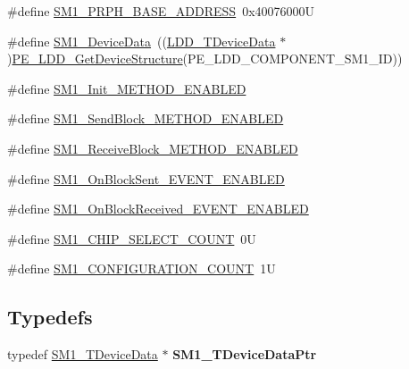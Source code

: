 \begin{DoxyCompactItemize}
\item 
\#define \hyperlink{group___s_m1__module_ga6a4395a6d4c473d7c1197b124efdc668}{S\-M1\-\_\-\-P\-R\-P\-H\-\_\-\-B\-A\-S\-E\-\_\-\-A\-D\-D\-R\-E\-S\-S}~0x40076000\-U
\item 
\#define \hyperlink{group___s_m1__module_gada367b0ac171dbad1e5c5ccfcdaf77a2}{S\-M1\-\_\-\-Device\-Data}~((\hyperlink{group___p_e___types__module_gac5cf1362f1f0e3a2ce71b1bf2276d091}{L\-D\-D\-\_\-\-T\-Device\-Data} $\ast$)\hyperlink{group___p_e___types__module_gaa1c23d559daef5bcd3327ca83fb56f5a}{P\-E\-\_\-\-L\-D\-D\-\_\-\-Get\-Device\-Structure}(P\-E\-\_\-\-L\-D\-D\-\_\-\-C\-O\-M\-P\-O\-N\-E\-N\-T\-\_\-\-S\-M1\-\_\-\-I\-D))
\item 
\#define \hyperlink{group___s_m1__module_gad63dbff60482a14f80f226c0b5731b13}{S\-M1\-\_\-\-Init\-\_\-\-M\-E\-T\-H\-O\-D\-\_\-\-E\-N\-A\-B\-L\-E\-D}
\item 
\#define \hyperlink{group___s_m1__module_gaa3c176c6eacc19cbbb7ae3f737c19693}{S\-M1\-\_\-\-Send\-Block\-\_\-\-M\-E\-T\-H\-O\-D\-\_\-\-E\-N\-A\-B\-L\-E\-D}
\item 
\#define \hyperlink{group___s_m1__module_gaf8134943679ffac8093daf312caa0e34}{S\-M1\-\_\-\-Receive\-Block\-\_\-\-M\-E\-T\-H\-O\-D\-\_\-\-E\-N\-A\-B\-L\-E\-D}
\item 
\#define \hyperlink{group___s_m1__module_gacc1de65aee130ae6911ddd0b36a2c499}{S\-M1\-\_\-\-On\-Block\-Sent\-\_\-\-E\-V\-E\-N\-T\-\_\-\-E\-N\-A\-B\-L\-E\-D}
\item 
\#define \hyperlink{group___s_m1__module_ga662b8a63d6e729f2066fb2495e5d8585}{S\-M1\-\_\-\-On\-Block\-Received\-\_\-\-E\-V\-E\-N\-T\-\_\-\-E\-N\-A\-B\-L\-E\-D}
\item 
\#define \hyperlink{group___s_m1__module_ga98e3a8869b1c791968b881f3b905b876}{S\-M1\-\_\-\-C\-H\-I\-P\-\_\-\-S\-E\-L\-E\-C\-T\-\_\-\-C\-O\-U\-N\-T}~0\-U
\item 
\#define \hyperlink{group___s_m1__module_ga6607b91a56a778525fd489758fa9b2f1}{S\-M1\-\_\-\-C\-O\-N\-F\-I\-G\-U\-R\-A\-T\-I\-O\-N\-\_\-\-C\-O\-U\-N\-T}~1\-U
\end{DoxyCompactItemize}
\subsection*{Typedefs}
\begin{DoxyCompactItemize}
\item 
\hypertarget{group___s_m1__module_gaef36ccd3e4d0417064487f2f271348c1}{typedef \hyperlink{struct_s_m1___t_device_data}{S\-M1\-\_\-\-T\-Device\-Data} $\ast$ {\bfseries S\-M1\-\_\-\-T\-Device\-Data\-Ptr}}\label{group___s_m1__module_gaef36ccd3e4d0417064487f2f271348c1}

\end{DoxyCompactItemize}
